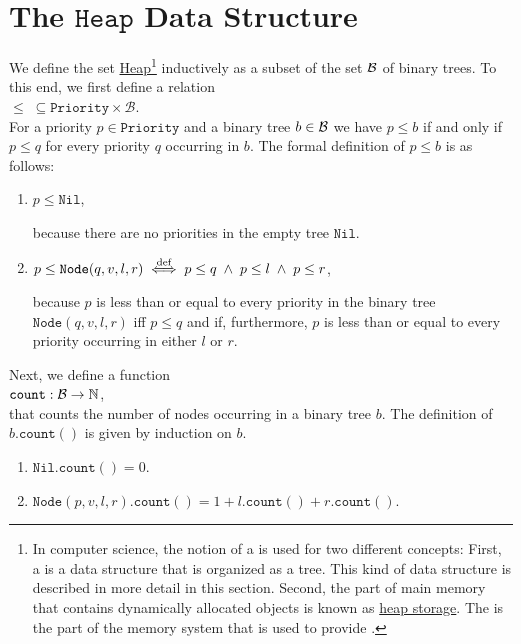 \section[Heaps]{The $\texttt{Heap}$ Data Structure}
We define the set \href{https://en.wikipedia.org/wiki/Heap_(data_structure)}{Heap}\footnote{
In computer science, the notion of a  is used for two different concepts:
First, a  is a data structure that is organized as a tree.  This kind of data structure
is described in more detail in this section. Second, the part of main memory that contains dynamically
allocated objects is known as \href{https://en.wikibooks.org/wiki/Memory_Management/Stacks_and_Heaps}{heap storage}.
The  is the part of the memory system that is used to provide .
}
inductively as a subset of the set $\mathcal{B}$ of binary trees.  To this end, we first define a relation
\\[0.2cm]
\hspace*{1.3cm}
$\leq \;\subseteq \texttt{Priority}  \times \mathcal{B}$.
\\[0.2cm]
For a priority $p \in \texttt{Priority}$ and a binary tree $b \in \mathcal{B}$ we have  $p \leq b$ 
if and only if $p \leq q$ for every priority $q$ occurring in $b$.  The formal definition of 
$p \leq b$ is as follows:
\begin{enumerate}
\item $p \leq \texttt{Nil}$,

      because there are no priorities in the empty tree $\texttt{Nil}$.
\item $p \leq \texttt{Node}(q,v,l,r) \;\stackrel{\mbox{\scriptsize def}}{\Longleftrightarrow}\; p \leq q \;\wedge\; p \leq l \;\wedge\; p \leq r$,
         
      because $p$ is less than or equal to every priority in the binary tree 
      $\texttt{Node}(q,v,l,r)$ iff  $p \leq q$ and if, furthermore, 
      $p$ is less than or equal to every priority occurring in either  $l$ or $r$.
\end{enumerate}
Next, we define a function \\[0.1cm]
\hspace*{1.3cm} $\texttt{count}: \mathcal{B} \rightarrow \mathbb{N}$, \\[0.1cm]
that counts the number of nodes occurring in a binary tree $b$.  The definition of
$b.\texttt{count}()$ is given by induction on $b$.
\begin{enumerate}
\item $\texttt{Nil}.\texttt{count}() = 0$.
\item $\texttt{Node}(p,v,l,r).\texttt{count}() = 1 + l.\texttt{count}() + r.\texttt{count}()$.
\end{enumerate}
